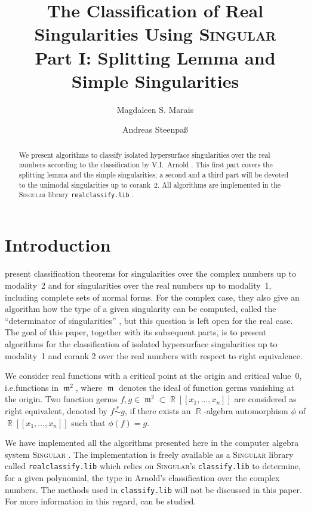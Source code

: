 \documentclass[noend]{amsproc}
\title[The Classification of Real Singularities Using \textsc{Singular}, %
Part I]%
{The Classification of Real Singularities Using \textsc{Singular}\\
Part I: Splitting Lemma and Simple Singularities}
\author{Magdaleen S. Marais}
\author{Andreas Steenpa\ss}
\theoremstyle{definition}
\newcommand{\Singular}{\textsc{Singular}}
\newcommand{\realclassify}{\texttt{realclassify.lib}}
\newcommand{\classify}{\texttt{classify.lib}}
\newcommand{\requiv}{\ensuremath{\mathrel{\overset{r}{\sim}}}}
\DeclareMathOperator{\m}{\mathfrak{m}}
\DeclareMathOperator{\R}{\mathbb{R}}
\begin{document}
\begin{abstract}
We present algorithms to classify isolated hypersurface singularities over the
real numbers according to the classification by V.I.~Arnold \citep{AVG1985}.
This first part covers the splitting lemma and the simple singularities; a
second and a third part will be devoted to the unimodal singularities up to
corank~2. All algorithms are implemented in the \Singular{} library
\realclassify{} \citep{realclassify}.
\end{abstract}

\maketitle


\section{Introduction}
\citet{AVG1985} present classification theorems for singularities over the
complex numbers up to modality~2 and for singularities over the real numbers up
to modality~1, including complete sets of normal forms. For the complex case,
they also give an algorithm how the type of a given singularity can be
computed, called the ``determinator of singularities''
\citep[cf.\@][ch.~16]{AVG1985}, but this question is left open for the real
case. The goal of this paper, together with its subsequent parts, is to present
algorithms for the classification of isolated hypersurface singularities up to
modality~1 and corank 2 over the real numbers with respect to right
equivalence.

We consider real functions with a critical point at the origin and critical
value~$0$, i.e.\@ functions in $\m^2$, where $\m$ denotes the ideal of function
germs vanishing at the origin. Two function germs $f, g \in \m^2 \subset
\R[[x_1,\ldots,x_n]]$ are considered as right equivalent, denoted by
$f \requiv g$, if there exists an $\R$-algebra automorphism $\phi$ of
$\R[[x_1,\ldots,x_n]]$ such that $\phi(f) = g$.

We have implemented all the algorithms presented here in the computer algebra
system \Singular{} \citep{DGPS}. The implementation is freely available as a
\Singular{} library called \realclassify{} which relies on \Singular's
\classify{} to determine, for a given polynomial, the type in Arnold's
classification over the complex numbers. The methods used in \classify{} will
not be discussed in this paper. For more information in this regard,
\citet{Kruger} can be studied.
\end{document}
